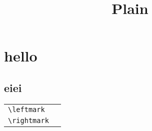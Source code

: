 \documentclass[a4paper]{report}
\title{Plain}
\author{}
\date{}
\begin{document}
\maketitle
\tableofcontents

\newpage
\chapter{hello}
\blindtext

\newpage
\section{eiei}
\blindtext

\newpage
\begin{table}[!ht]
\begin{tabular}{l | l}
\texttt{\textbackslash{}leftmark}       &       \\
\texttt{\textbackslash{}rightmark}      &
\end{tabular}
\end{table}

\leftmark

\rightmark
\end{document}
